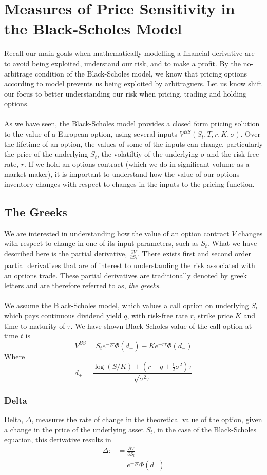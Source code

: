 \documentclass{article}
\begin{document}
\newpage
\section{Measures of Price Sensitivity in the Black-Scholes Model}
Recall our main goals when mathematically modelling a financial derivative are to avoid being exploited, understand our risk, and to make a profit. By the no-arbitrage condition of the Black-Scholes model, we know that pricing options according to model prevents us being exploited by arbitraguers. Let us know shift our focus to better understanding our risk when pricing, trading and holding options. \\
\\
As we have seen, the Black-Scholes model provides a closed form pricing solution to the value of a European option, using several inputs  $V^{BS}(S_t, T, r, K, \sigma)$. Over the lifetime of an option, the values of some of the inputs can change, particularly the price of the underlying $S_t$, the volatiltiy of the underlying $\sigma$ and the risk-free rate, $r$. If we hold an options contract (which we do in significant volume as a market maker), it is important to understand how the value of our options inventory changes with respect to changes in the inputs to the pricing function.

\subsection{The Greeks}
We are interested in understanding how the value of an option contract $V$ changes with respect to change in one of its input parameters, such as $S_t$. What we have described here is the partial derivative, $\frac{\partial V}{\partial S_t}$. There exists first and second order partial derivatives that are of interest to understanding the risk associated with an options trade. These partial derivatives are traditionally denoted by greek letters and are therefore referred to as, \textit{the greeks}. \\
\\
We assume the Black-Scholes model, which values a call option on underlying $S_t$ which pays continuous dividend yield $q$, with risk-free rate $r$, strike price $K$ and time-to-maturity of $\tau$. We have shown Black-Scholes value of the call option at time $t$ is 
$$V^{BS} = S_t e^{-q\tau}\Phi(d_+) - Ke^{-r\tau}\Phi(d_-)$$
Where 
$$d_{\pm} = \frac{\log(S/K) + (r-q \pm \frac{1}{2}\sigma^2)\tau}{\sqrt{\sigma^2\tau}}$$
\subsubsection{Delta}
Delta, $\Delta$, measures the rate of change in the theoretical value of the option, given a change in the price of the underlying asset $S_t$, in the case of the Black-Scholes equation, this derivative results in 
\begin{align*}
    \Delta :&= \frac{\partial V}{\partial S_t} \\
    &=  e^{-q\tau}\Phi(d_+)
\end{align*}
\end{document}
